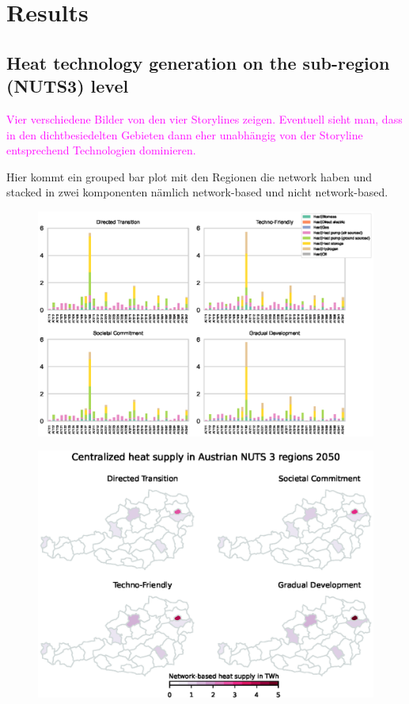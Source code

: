 \section{Results}

\subsection{Heat technology generation on the sub-region (NUTS3) level}
\textcolor{magenta}{Vier verschiedene Bilder von den vier Storylines zeigen. Eventuell sieht man, dass in den dichtbesiedelten Gebieten dann eher unabhängig von der Storyline entsprechend Technologien dominieren.}

Hier kommt ein grouped bar plot mit den Regionen die network haben und stacked in zwei komponenten nämlich network-based und nicht network-based. 



\begin{figure}
	\centering
	\includegraphics[width=1\linewidth]{figures/4_Results/NUTS3.eps}
	\caption{}
	\label{fig:res1}
\end{figure}

\begin{figure}
	\centering
	\includegraphics[width=1\linewidth]{figures/4_Results/Heatmap.eps}
	\caption{}
	\label{fig:res2}
\end{figure}
